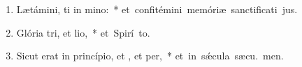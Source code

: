 \begin{flushleft}
\begin{enumerate}[leftmargin=*]
\item Lætámini, ti in mino:~* \mbox{et confitémini memóriæ sanctificati jus.}

\item Glória tri, et lio,~* \mbox{et Spirí to.}

\item Sicut erat in princípio, et , et per,~* \mbox{et in sǽcula sæcu. men.}

\end{enumerate}
\end{flushleft}